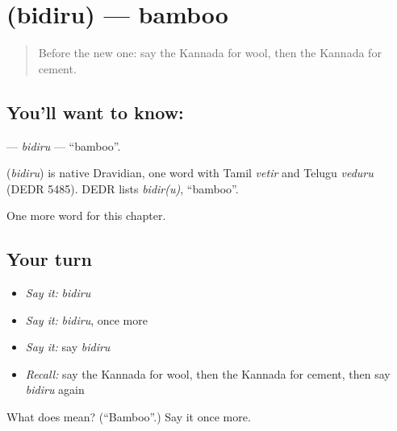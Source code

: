 \section[\texorpdfstring{\kn{ಬಿದಿರು} (bidiru)}{ಬಿದಿರು (bidiru)}]{ (bidiru) — bamboo}

\label{lesson:KA-C302-bidiru}



\begin{quote}
Before the new one: say the Kannada for wool, then the Kannada for cement.
\end{quote}

\subsection*{You'll want to know: }
\textbf{} — \emph{bidiru} — \textquotedblleft{}bamboo\textquotedblright{}.

\begin{cousinweb}
\textbf{} (\emph{bidiru}) is native Dravidian, one word with Tamil \emph{vetir} and Telugu \emph{veduru} (DEDR 5485). DEDR lists \emph{bidir(u)}, \textquotedblleft{}bamboo\textquotedblright{}.
\end{cousinweb}

\begin{grammarlens}[title={What you've built}]
One more word for this chapter.
\end{grammarlens}

\subsection*{Your turn}
\begin{itemize}
\raggedright
  \item \emph{Say it:} \emph{bidiru}
  \item \emph{Say it:} \emph{bidiru}, once more
  \item \emph{Say it:} say \emph{bidiru}
  \item \emph{Recall:} say the Kannada for wool, then the Kannada for cement, then say \emph{bidiru} again
\end{itemize}

\begin{tcolorbox}[breakable,colback=teal!4,colframe=teal!35!black,title={Before you move on}]
What does  mean? (\textquotedblleft{}Bamboo\textquotedblright{}.) Say it once more.
\end{tcolorbox}
